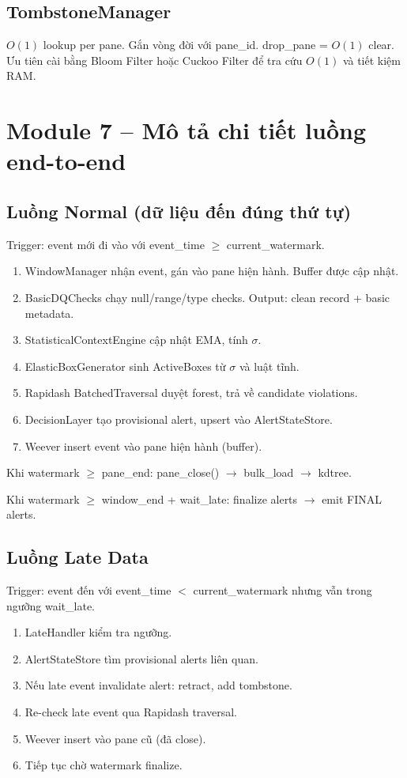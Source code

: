 \subsection{TombstoneManager}
$O(1)$ lookup per pane. Gắn vòng đời với pane\_id. drop\_pane = $O(1)$ clear. Ưu tiên cài bằng Bloom Filter hoặc Cuckoo Filter để tra cứu $O(1)$ và tiết kiệm RAM.

\section{Module 7 -- Mô tả chi tiết luồng end-to-end}

\subsection{Luồng Normal (dữ liệu đến đúng thứ tự)}

Trigger: event mới đi vào với event\_time $\geq$ current\_watermark.

\begin{enumerate}
  \item WindowManager nhận event, gán vào pane hiện hành. Buffer được cập nhật.
  \item BasicDQChecks chạy null/range/type checks. Output: clean record + basic metadata.
  \item StatisticalContextEngine cập nhật EMA, tính $\sigma$.
  \item ElasticBoxGenerator sinh ActiveBoxes từ $\sigma$ và luật tĩnh.
  \item Rapidash BatchedTraversal duyệt forest, trả về candidate violations.
  \item DecisionLayer tạo provisional alert, upsert vào AlertStateStore.
  \item Weever insert event vào pane hiện hành (buffer).
\end{enumerate}

Khi watermark $\geq$ pane\_end: pane\_close() $\rightarrow$ bulk\_load $\rightarrow$ kdtree.

Khi watermark $\geq$ window\_end + wait\_late: finalize alerts $\rightarrow$ emit FINAL alerts.

\subsection{Luồng Late Data}

Trigger: event đến với event\_time $<$ current\_watermark nhưng vẫn trong ngưỡng wait\_late.

\begin{enumerate}
  \item LateHandler kiểm tra ngưỡng.
  \item AlertStateStore tìm provisional alerts liên quan.
  \item Nếu late event invalidate alert: retract, add tombstone.
  \item Re-check late event qua Rapidash traversal.
  \item Weever insert vào pane cũ (đã close).
  \item Tiếp tục chờ watermark finalize.
\end{enumerate}

